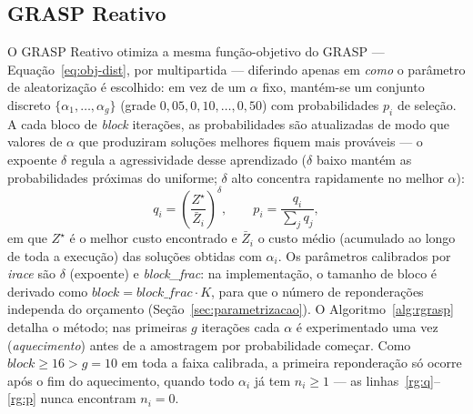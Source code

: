 \documentclass[12pt, a4paper]{article}
\begin{document}
\subsection{GRASP Reativo}\label{sec:rgrasp}
O GRASP Reativo \citep{prais2000reactive} otimiza a mesma função-objetivo do GRASP --- Equação~\eqref{eq:obj-dist}, por multipartida --- diferindo apenas em \emph{como} o parâmetro de aleatorização é escolhido: em vez de um $\alpha$ fixo, mantém-se um conjunto discreto $\{\alpha_1,\dots,\alpha_g\}$ (grade $0{,}05,0{,}10,\dots,0{,}50$) com probabilidades $p_i$ de seleção. A cada bloco de \textit{block} iterações, as probabilidades são atualizadas de modo que valores de $\alpha$ que produziram soluções melhores fiquem mais prováveis --- o expoente $\delta$ regula a agressividade desse aprendizado ($\delta$ baixo mantém as probabilidades próximas do uniforme; $\delta$ alto concentra rapidamente no melhor $\alpha$):
\begin{equation}
q_i=\left(\frac{Z^\star}{\bar Z_i}\right)^{\!\delta},\qquad p_i=\frac{q_i}{\sum_{j} q_j},
\end{equation}
em que $Z^\star$ é o melhor custo encontrado e $\bar Z_i$ o custo médio (acumulado ao longo de toda a execução) das soluções obtidas com $\alpha_i$. Os parâmetros calibrados por \textit{irace} são $\delta$ (expoente) e \textit{block\_frac}: na implementação, o tamanho de bloco é derivado como $\textit{block}=\textit{block\_frac}\cdot K$, para que o número de reponderações independa do orçamento (Seção~\ref{sec:parametrizacao}). O Algoritmo~\ref{alg:rgrasp} detalha o método; nas primeiras $g$ iterações cada $\alpha$ é experimentado uma vez (\emph{aquecimento}) antes de a amostragem por probabilidade começar. Como $\textit{block} \ge 16 > g = 10$ em toda a faixa calibrada, a primeira reponderação só ocorre após o fim do aquecimento, quando todo $\alpha_i$ já tem $n_i \ge 1$ --- as linhas~\ref{rg:q}--\ref{rg:p} nunca encontram $n_i=0$.
\end{document}
